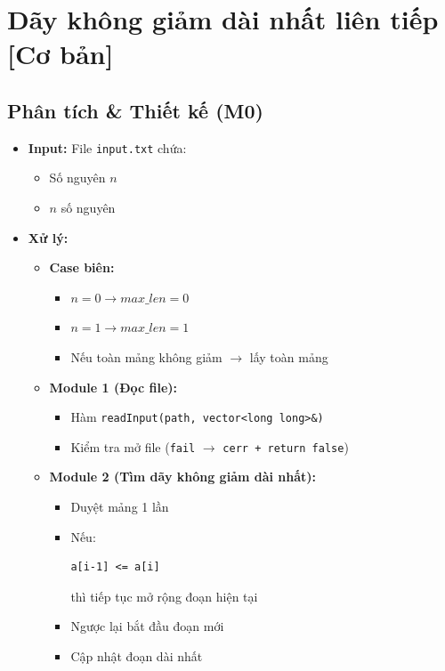 \section{Dãy không giảm dài nhất liên tiếp [Cơ bản]}
\subsection{Phân tích \& Thiết kế (M0)}
\begin{itemize}
    \item \textbf{Input:}
    File \texttt{input.txt} chứa:
    \begin{itemize}
        \item Số nguyên $n$
        \item $n$ số nguyên
    \end{itemize}

    \item \textbf{Xử lý:}
    \begin{itemize}
        \item \textbf{Case biên:}
        \begin{itemize}
            \item $n = 0 \rightarrow max\_len = 0$
            \item $n = 1 \rightarrow max\_len = 1$
            \item Nếu toàn mảng không giảm $\rightarrow$ lấy toàn mảng
        \end{itemize}

        \item \textbf{Module 1 (Đọc file):}
        \begin{itemize}
            \item Hàm \texttt{readInput(path, vector<long long>\&)}
            \item Kiểm tra mở file (\texttt{fail} $\rightarrow$ \texttt{cerr + return false})
        \end{itemize}

        \item \textbf{Module 2 (Tìm dãy không giảm dài nhất):}
        \begin{itemize}
            \item Duyệt mảng 1 lần
            \item Nếu:
\begin{lstlisting}
a[i-1] <= a[i]
\end{lstlisting}
            thì tiếp tục mở rộng đoạn hiện tại
            \item Ngược lại bắt đầu đoạn mới
            \item Cập nhật đoạn dài nhất
        \end{itemize}


\end{itemize}
\end{itemize}
